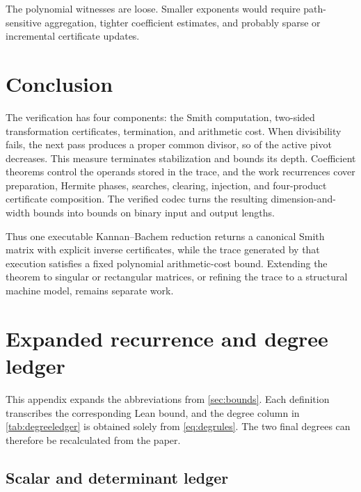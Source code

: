 \documentclass[11pt]{article}
\theoremstyle{definition}
\newcommand{\code}[1]{\texttt{\detokenize{#1}}}
\begin{document}
The polynomial witnesses are loose.  Smaller exponents would require path-sensitive aggregation, tighter coefficient estimates, and probably sparse or incremental certificate updates.

\section{Conclusion}

The verification has four components: the Smith computation, two-sided transformation certificates, termination, and arithmetic cost.  When divisibility fails, the next pass produces a proper common divisor, so \code{Nat.size} of the active pivot decreases.  This measure terminates stabilization and bounds its depth.  Coefficient theorems control the operands stored in the trace, and the work recurrences cover preparation, Hermite phases, searches, clearing, injection, and four-product certificate composition.  The verified codec turns the resulting dimension-and-width bounds into bounds on binary input and output lengths.

Thus one executable Kannan--Bachem reduction returns a canonical Smith matrix with explicit inverse certificates, while the trace generated by that execution satisfies a fixed polynomial arithmetic-cost bound.  Extending the theorem to singular or rectangular matrices, or refining the trace to a structural machine model, remains separate work.




\appendix

\section{Expanded recurrence and degree ledger}
\label{app:ledger}

This appendix expands the abbreviations from \cref{sec:bounds}.  Each definition transcribes the corresponding Lean bound, and the degree column in \cref{tab:degreeledger} is obtained solely from \eqref{eq:degrules}.  The two final degrees can therefore be recalculated from the paper.

\subsection{Scalar and determinant ledger}
\end{document}
